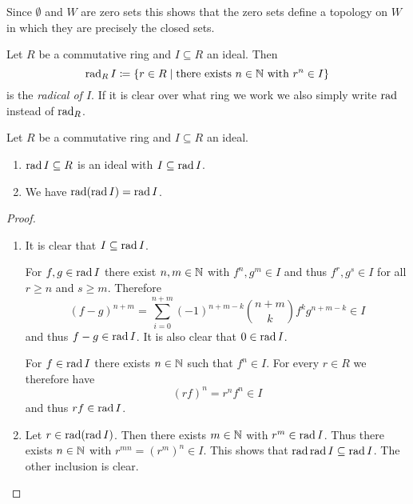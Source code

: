 \begin{rem}
  Since $\emptyset$ and $W$ are zero sets this shows that the zero sets define a topology on $W$ in which they are precisely the closed sets.
\end{rem}


\begin{defi}
  Let $R$ be a commutative ring and $I \subseteq R$ an ideal. Then
  \[
              \operatorname{rad}_R I
    \coloneqq \{
                r \in R
              \mid
                \text{there exists }
                n \in \mathbb{N}
                \text{ with }
                r^n \in I
              \}
  \]
  is the \emph{radical of $I$}.
  If it is clear over what ring we work we also simply write $\operatorname{rad}$ instead of $\operatorname{rad}_R$.
\end{defi}


\begin{lem}
  Let $R$ be a commutative ring and $I \subseteq R$ an ideal. 
  \begin{enumerate}[label=\emph{\alph*)},leftmargin=*]
    \item
      $\operatorname{rad} I  \subseteq R$ is an ideal with $I \subseteq \operatorname{rad} I$.
    \item
      We have $\operatorname{rad}(\operatorname{rad} I) = \operatorname{rad} I$.
  \end{enumerate}
\end{lem}
\begin{proof}
  \begin{enumerate}[label=\emph{\alph*)},leftmargin=*]
    \item
      It is clear that $I \subseteq \operatorname{rad} I$.
      
      For $f,g \in \operatorname{rad} I$ there exist $n,m \in \mathbb{N}$ with $f^n, g^m \in I$ and thus $f^r, g^s \in I$ for all $r \geq n$ and $s \geq m$. Therefore
      \[
            (f - g)^{n+m}
        =   \sum_{i=0}^{n+m} (-1)^{n+m-k} \binom{n+m}{k} f^k g^{n+m-k}
        \in I
      \]
      and thus $f-g \in \operatorname{rad} I$. It is also clear that $0 \in \operatorname{rad} I$.
      
      For $f \in \operatorname{rad} I$ there exists $n \in \mathbb{N}$ such that $f^n \in I$.
      For every $r \in R$ we therefore have
      \[
            (rf)^n
        =   r^n f^n
        \in I
      \]
      and thus $rf \in \operatorname{rad} I$.
    \item
      Let $r \in \operatorname{rad}(\operatorname{rad} I)$.
      Then there exists $m \in \mathbb{N}$ with $r^m \in \operatorname{rad} I$.
      Thus there exists $n \in \mathbb{N}$ with $r^{mn} = (r^m)^n \in I$.
      This shows that $\operatorname{rad} \operatorname{rad} I \subseteq \operatorname{rad} I$.
      The other inclusion is clear.
    \qedhere
  \end{enumerate}
\end{proof}


